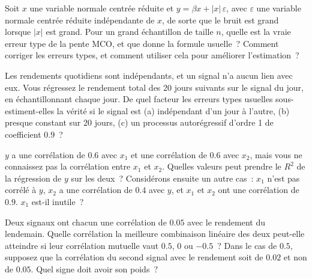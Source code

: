 \begin{question}\label{iq:iv1:regression:20}
Soit $x$ une variable normale centrée réduite et $y = \beta x + |x|\,\varepsilon$, avec $\varepsilon$ une variable normale centrée réduite indépendante de $x$, de sorte que le bruit est grand lorsque $|x|$ est grand. Pour un grand échantillon de taille $n$, quelle est la vraie erreur type de la pente MCO, et que donne la formule usuelle~? Comment corriger les erreurs types, et comment utiliser cela pour améliorer l'estimation~?
\end{question}

\begin{question}\label{iq:iv1:regression:21}
Les rendements quotidiens sont indépendants, et un signal n'a aucun lien avec eux. Vous régressez le rendement total des 20 jours suivants sur le signal du jour, en échantillonnant chaque jour. De quel facteur les erreurs types usuelles sous-estiment-elles la vérité si le signal est (a) indépendant d'un jour à l'autre, (b) presque constant sur 20 jours, (c) un processus autorégressif d'ordre 1 de coefficient $0.9$~?
\end{question}

\begin{question}\label{iq:iv1:regression:22}
$y$ a une corrélation de $0.6$ avec $x_1$ et une corrélation de $0.6$ avec $x_2$, mais vous ne connaissez pas la corrélation entre $x_1$ et $x_2$. Quelles valeurs peut prendre le $R^2$ de la régression de $y$ sur les deux~? Considérons ensuite un autre cas~: $x_1$ n'est pas corrélé à $y$, $x_2$ a une corrélation de $0.4$ avec $y$, et $x_1$ et $x_2$ ont une corrélation de $0.9$. $x_1$ est-il inutile~?
\end{question}

\begin{question}\label{iq:iv1:regression:23}
Deux signaux ont chacun une corrélation de $0.05$ avec le rendement du lendemain. Quelle corrélation la meilleure combinaison linéaire des deux peut-elle atteindre si leur corrélation mutuelle vaut $0.5$, $0$ ou $-0.5$~? Dans le cas de $0.5$, supposez que la corrélation du second signal avec le rendement soit de $0.02$ et non de $0.05$. Quel signe doit avoir son poids~?
\end{question}

